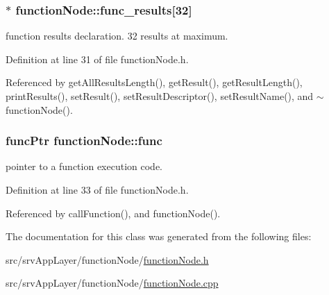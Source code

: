 \hypertarget{classfunctionNode_af03bce8879751777e7465bd27fc56522}{
\subsubsection[{func\_\-results}]{$\ast$ {\bf functionNode::func\_\-results}\mbox{[}32\mbox{]}}}
\label{d1/d20/classfunctionNode_af03bce8879751777e7465bd27fc56522}


function results declaration. 32 results at maximum. 



Definition at line 31 of file functionNode.h.



Referenced by getAllResultsLength(), getResult(), getResultLength(), printResults(), setResult(), setResultDescriptor(), setResultName(), and $\sim$functionNode().

\hypertarget{classfunctionNode_ab7b55825d92cdac9d2304c5c24bfb162}{
\subsubsection[{func}]{\setlength{\rightskip}{0pt plus 5cm}funcPtr {\bf functionNode::func}}}
\label{d1/d20/classfunctionNode_ab7b55825d92cdac9d2304c5c24bfb162}


pointer to a function execution code. 



Definition at line 33 of file functionNode.h.



Referenced by callFunction(), and functionNode().



The documentation for this class was generated from the following files:\begin{DoxyCompactItemize}
\item 
src/srvAppLayer/functionNode/\hyperlink{functionNode_8h}{functionNode.h}\item 
src/srvAppLayer/functionNode/\hyperlink{functionNode_8cpp}{functionNode.cpp}\end{DoxyCompactItemize}
